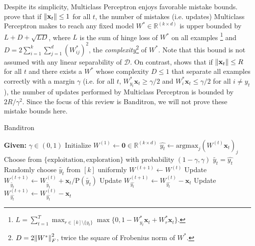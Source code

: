 \documentclass{article}
\begin{document}
Despite its simplicity, Multiclass Perceptron enjoys favorable mistake bounds. \citet{fink2006online} prove that if $\norm{\mathbf{x}_t}\leq1$ for all $t$, the number of mistakes (i.e. updates) Multiclass Perceptron makes to reach any fixed model $W^*\in\mathbb{R}^{(k\times d)}$ is upper bounded by $L+D+\sqrt{LD}$, where $L$ is the sum of hinge loss of $W^*$ on all examples \footnote{$L=\sum_{t=1}^T\max_{r\in[k]\setminus\{y_t\}}\max\{0,1-W^*_{y_t}\mathbf{x}_t+W^*_r\mathbf{x}_t\}$.} and $D=2\sum_{i=1}^{k}\sum_{j=1}^d (W^*_{ij})^2$, the \textit{complexity}\footnote{$D=2\norm{W^*}_F^2$, twice the square of Frobenius norm of $W^*$.} of $W^*$. Note that this bound is not assumed with any linear separability of $\mathcal{D}$. On contrast, \citet{crammer2003ultraconservative} shows that if $\norm{\mathbf{x}_t}\leq R$ for all $t$ and there exists a $W^*$ whose complexity $D\leq1$ that separate all examples correctly with a margin $\gamma$ (i.e. for all $t$, $W^*_{y_t}\mathbf{x}_t\geq\gamma/2$ and $W^*_i\mathbf{x}_t\leq\gamma/2$ for all $i\neq y_t$), the number of updates performed by Multiclass Perceptron is bounded by $2R/\gamma^2$. Since the focus of this review is Banditron, we will not prove these mistake bounds here.

\begin{algorithm}[bt]
    \caption{Banditron}\label{alg:band}
 \begin{algorithmic}
    \STATE \textbf{Given:} $\gamma\in(0,1)$
    \STATE Initialize $W^{(1)}\leftarrow\mathbf{0}\in\mathbb{R}^{(k\times d)}$
    \STATE $\hat{y_t}\leftarrow\text{argmax}_j(W^{(t)}\mathbf{x}_t)_j$
    \STATE Choose from $\{\text{exploitation},\text{exploration}\}$ with probability $(1-\gamma,\gamma)$
    \STATE $\tilde{y_t}=\hat{y_t}$
    \ELSE
    \STATE Randomly choose $\tilde{y_t}$ from $[k]$ uniformly
    \ENDIF
    \STATE $W^{(t+1)}\leftarrow W^{(t)}$
        \STATE Update $W^{(t+1)}_{\tilde{y_t}}\leftarrow W^{(t)}_{\tilde{y_t}}+\mathbf{x}_t/\text{P}(\tilde{y_t})$
        \STATE Update $W^{(t+1)}_{\hat{y_t}} \leftarrow W^{(t)}_{\hat{y_t}} - \mathbf{x}_t$
    \ELSE
    \STATE Update $W^{(t+1)}_{\hat{y_t}} \leftarrow W^{(t)}_{\hat{y_t}} - \mathbf{x}_t$
    \ENDIF
    \ENDFOR
 \end{algorithmic}
\end{algorithm}
\end{document}
